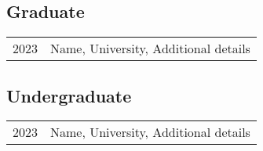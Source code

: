 

\subsection*{Graduate}
\begin{longtable}[l]{@{}p{} p{}}

    2023 & Name, University, Additional details \\

\end{longtable}

\subsection*{Undergraduate}
\begin{longtable}[l]{@{}p{} p{}}

    2023 & Name, University, Additional details \\

\end{longtable}